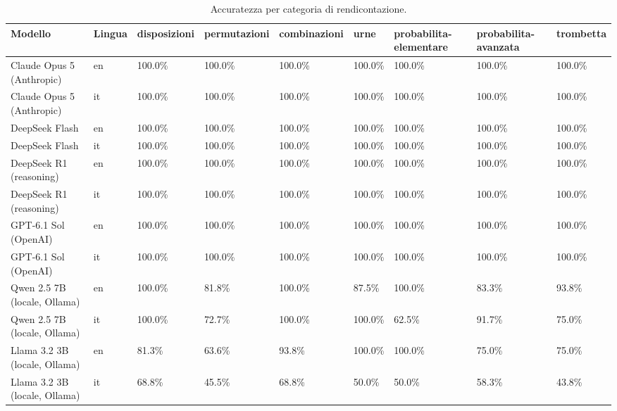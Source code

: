 \begin{table}[htbp]
\centering\small
\begin{tabularx}{\textwidth}{lXXXXXXXX}
\toprule
Modello & Lingua & disposizioni & permutazioni & combinazioni & urne & probabilita-elementare & probabilita-avanzata & trombetta \\
\midrule
Claude Opus 5 (Anthropic) & en & 100.0\% & 100.0\% & 100.0\% & 100.0\% & 100.0\% & 100.0\% & 100.0\% \\
Claude Opus 5 (Anthropic) & it & 100.0\% & 100.0\% & 100.0\% & 100.0\% & 100.0\% & 100.0\% & 100.0\% \\
DeepSeek Flash & en & 100.0\% & 100.0\% & 100.0\% & 100.0\% & 100.0\% & 100.0\% & 100.0\% \\
DeepSeek Flash & it & 100.0\% & 100.0\% & 100.0\% & 100.0\% & 100.0\% & 100.0\% & 100.0\% \\
DeepSeek R1 (reasoning) & en & 100.0\% & 100.0\% & 100.0\% & 100.0\% & 100.0\% & 100.0\% & 100.0\% \\
DeepSeek R1 (reasoning) & it & 100.0\% & 100.0\% & 100.0\% & 100.0\% & 100.0\% & 100.0\% & 100.0\% \\
GPT-6.1 Sol (OpenAI) & en & 100.0\% & 100.0\% & 100.0\% & 100.0\% & 100.0\% & 100.0\% & 100.0\% \\
GPT-6.1 Sol (OpenAI) & it & 100.0\% & 100.0\% & 100.0\% & 100.0\% & 100.0\% & 100.0\% & 100.0\% \\
Qwen 2.5 7B (locale, Ollama) & en & 100.0\% & 81.8\% & 100.0\% & 87.5\% & 100.0\% & 83.3\% & 93.8\% \\
Qwen 2.5 7B (locale, Ollama) & it & 100.0\% & 72.7\% & 100.0\% & 100.0\% & 62.5\% & 91.7\% & 75.0\% \\
Llama 3.2 3B (locale, Ollama) & en & 81.3\% & 63.6\% & 93.8\% & 100.0\% & 100.0\% & 75.0\% & 75.0\% \\
Llama 3.2 3B (locale, Ollama) & it & 68.8\% & 45.5\% & 68.8\% & 50.0\% & 50.0\% & 58.3\% & 43.8\% \\
\bottomrule
\end{tabularx}
\caption{Accuratezza per categoria di rendicontazione.}
\label{tab:benchmark-categories}
\end{table}
